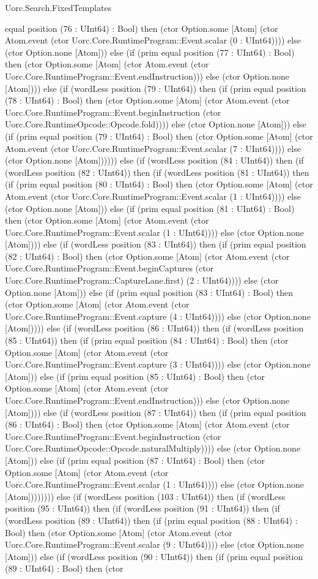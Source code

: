 \begin{lexlean}{Uorc.Search.FixedTemplates}
\begin{semanticmodule}
{equal position (76 : UInt64) : Bool) then (ctor Option.some [Atom] (ctor Atom.event (ctor Uorc.Core.RuntimeProgram::Event.scalar (0 : UInt64)))) else (ctor Option.none [Atom])) else (if (prim equal position (77 : UInt64) : Bool) then (ctor Option.some [Atom] (ctor Atom.event (ctor Uorc.Core.RuntimeProgram::Event.endInstruction))) else (ctor Option.none [Atom]))) else (if (wordLess position (79 : UInt64)) then (if (prim equal position (78 : UInt64) : Bool) then (ctor Option.some [Atom] (ctor Atom.event (ctor Uorc.Core.RuntimeProgram::Event.beginInstruction (ctor Uorc.Core.RuntimeOpcode::Opcode.fold)))) else (ctor Option.none [Atom])) else (if (prim equal position (79 : UInt64) : Bool) then (ctor Option.some [Atom] (ctor Atom.event (ctor Uorc.Core.RuntimeProgram::Event.scalar (7 : UInt64)))) else (ctor Option.none [Atom]))))) else (if (wordLess position (84 : UInt64)) then (if (wordLess position (82 : UInt64)) then (if (wordLess position (81 : UInt64)) then (if (prim equal position (80 : UInt64) : Bool) then (ctor Option.some [Atom] (ctor Atom.event (ctor Uorc.Core.RuntimeProgram::Event.scalar (1 : UInt64)))) else (ctor Option.none [Atom])) else (if (prim equal position (81 : UInt64) : Bool) then (ctor Option.some [Atom] (ctor Atom.event (ctor Uorc.Core.RuntimeProgram::Event.scalar (1 : UInt64)))) else (ctor Option.none [Atom]))) else (if (wordLess position (83 : UInt64)) then (if (prim equal position (82 : UInt64) : Bool) then (ctor Option.some [Atom] (ctor Atom.event (ctor Uorc.Core.RuntimeProgram::Event.beginCaptures (ctor Uorc.Core.RuntimeProgram::CaptureLane.first) (2 : UInt64)))) else (ctor Option.none [Atom])) else (if (prim equal position (83 : UInt64) : Bool) then (ctor Option.some [Atom] (ctor Atom.event (ctor Uorc.Core.RuntimeProgram::Event.capture (4 : UInt64)))) else (ctor Option.none [Atom])))) else (if (wordLess position (86 : UInt64)) then (if (wordLess position (85 : UInt64)) then (if (prim equal position (84 : UInt64) : Bool) then (ctor Option.some [Atom] (ctor Atom.event (ctor Uorc.Core.RuntimeProgram::Event.capture (3 : UInt64)))) else (ctor Option.none [Atom])) else (if (prim equal position (85 : UInt64) : Bool) then (ctor Option.some [Atom] (ctor Atom.event (ctor Uorc.Core.RuntimeProgram::Event.endInstruction))) else (ctor Option.none [Atom]))) else (if (wordLess position (87 : UInt64)) then (if (prim equal position (86 : UInt64) : Bool) then (ctor Option.some [Atom] (ctor Atom.event (ctor Uorc.Core.RuntimeProgram::Event.beginInstruction (ctor Uorc.Core.RuntimeOpcode::Opcode.naturalMultiply)))) else (ctor Option.none [Atom])) else (if (prim equal position (87 : UInt64) : Bool) then (ctor Option.some [Atom] (ctor Atom.event (ctor Uorc.Core.RuntimeProgram::Event.scalar (1 : UInt64)))) else (ctor Option.none [Atom]))))))) else (if (wordLess position (103 : UInt64)) then (if (wordLess position (95 : UInt64)) then (if (wordLess position (91 : UInt64)) then (if (wordLess position (89 : UInt64)) then (if (prim equal position (88 : UInt64) : Bool) then (ctor Option.some [Atom] (ctor Atom.event (ctor Uorc.Core.RuntimeProgram::Event.scalar (9 : UInt64)))) else (ctor Option.none [Atom])) else (if (wordLess position (90 : UInt64)) then (if (prim equal position (89 : UInt64) : Bool) then (ctor }
\end{semanticmodule}
\end{lexlean}
